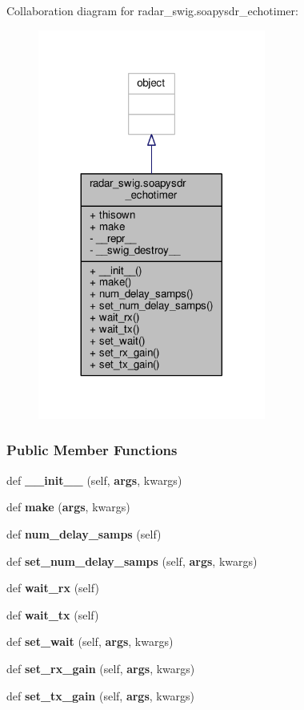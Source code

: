 Collaboration diagram for radar\+\_\+swig.\+soapysdr\+\_\+echotimer\+:
\nopagebreak
\begin{figure}[H]
\begin{center}
\leavevmode
\includegraphics[width=212pt]{d8/dcb/classradar__swig_1_1soapysdr__echotimer__coll__graph}
\end{center}
\end{figure}
\subsubsection*{Public Member Functions}
\begin{DoxyCompactItemize}
\item 
def {\bf \+\_\+\+\_\+init\+\_\+\+\_\+} (self, {\bf args}, kwargs)
\item 
def {\bf make} ({\bf args}, kwargs)
\item 
def {\bf num\+\_\+delay\+\_\+samps} (self)
\item 
def {\bf set\+\_\+num\+\_\+delay\+\_\+samps} (self, {\bf args}, kwargs)
\item 
def {\bf wait\+\_\+rx} (self)
\item 
def {\bf wait\+\_\+tx} (self)
\item 
def {\bf set\+\_\+wait} (self, {\bf args}, kwargs)
\item 
def {\bf set\+\_\+rx\+\_\+gain} (self, {\bf args}, kwargs)
\item 
def {\bf set\+\_\+tx\+\_\+gain} (self, {\bf args}, kwargs)
\end{DoxyCompactItemize}
